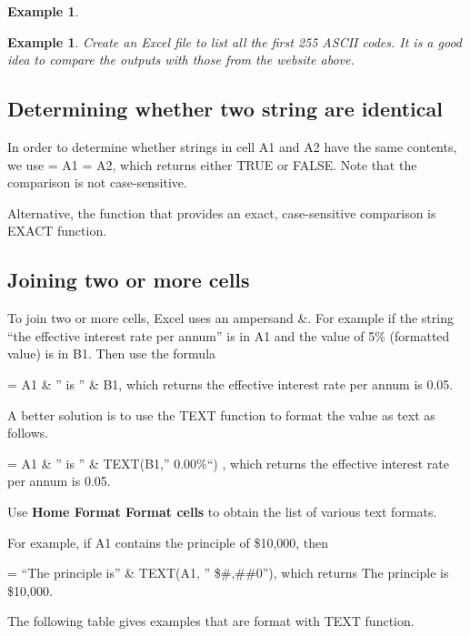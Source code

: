 \documentclass[
]{article}
\theoremstyle{definition}
\theoremstyle{definition}
\newtheorem{example}{Example}[section]
\theoremstyle{definition}
\theoremstyle{definition}
\theoremstyle{remark}
\begin{document}
\begin{example}
\protect\hypertarget{exm:unlabeled-div-2}{}\label{exm:unlabeled-div-2}

\textbf{Example 1}. \emph{Create an Excel file to list all the first 255 ASCII
codes. It is a good idea to compare the outputs with those from the
website above.}

\end{example}

\hypertarget{determining-whether-two-string-are-identical}{%
\subsection{Determining whether two string are identical}\label{determining-whether-two-string-are-identical}}

In order to determine whether strings in cell A1 and A2 have the same
contents, we use = A1 = A2, which returns either TRUE or FALSE. Note
that the comparison is not case-sensitive.

Alternative, the function that provides an exact, case-sensitive
comparison is EXACT function.

\hypertarget{joining-two-or-more-cells}{%
\subsection{Joining two or more cells}\label{joining-two-or-more-cells}}

To join two or more cells, Excel uses an ampersand \&. For example if the
string ``the effective interest rate per annum'' is in A1 and the value of
5\% (formatted value) is in B1. Then use the formula

= A1 \& '' is '' \& B1, which returns the effective interest rate per annum
is 0.05.

A better solution is to use the TEXT function to format the value as
text as follows.

= A1 \& '' is '' \& TEXT(B1,'' 0.00\%``) , which returns the effective interest
rate per annum is 0.05.

Use \textbf{Home Format Format cells} to obtain the list of various text
formats.

For example, if A1 contains the principle of \$10,000, then

= ``The principle is'' \& TEXT(A1, '' \$\#,\#\#0''), which returns The
principle is \$10,000.

The following table gives examples that are format with TEXT function.
\end{document}
